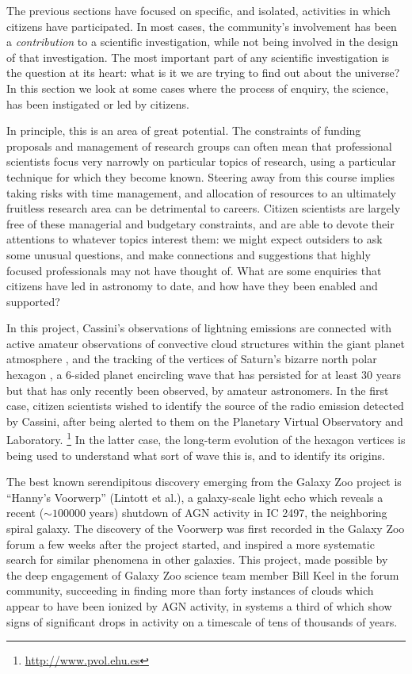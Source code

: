 \documentclass{ar2e}
\begin{document}
The previous sections have focused on specific, and isolated, activities in
which citizens have participated. In most cases, the community's involvement has
been a {\it contribution} to a scientific investigation, while not being
involved in the design of that investigation. The most important part of any
scientific investigation is the question at its heart: what is it we are trying
to find out about the universe? In this section we look at some cases where the
process of enquiry, the science, has been instigated or led by citizens.  

In principle, this is an area of great potential. The constraints of funding
proposals and management of research groups can often mean that professional
scientists focus very narrowly on particular topics of research, using a
particular technique for which they become known.  Steering away from this
course implies taking risks with time management, and allocation of resources to
an ultimately fruitless research area can be detrimental to careers.  Citizen
scientists are largely free of these managerial and budgetary constraints, and
are able to devote their attentions to whatever topics interest them: we might
expect outsiders to ask some unusual questions, and make connections and
suggestions that highly focused professionals may not have thought of. What are
some enquiries that citizens have led in astronomy to date, and how have they
been enabled and supported?


  In this project, Cassini's observations of
lightning emissions are connected with active amateur observations of
convective cloud structures within the giant planet atmosphere
\citep{Fischer++2011},  and the tracking of the vertices of Saturn's bizarre
north polar hexagon \citep{godfrey88}, a 6-sided planet encircling wave that
has persisted for at least 30 years but that has only recently been observed,
by amateur astronomers.  In the first case, citizen scientists wished to
identify the source of the radio emission detected by Cassini, after being
alerted to them on the Planetary Virtual  Observatory and Laboratory.
\footnote{\url{http://www.pvol.ehu.es}} In the latter case, the long-term evolution
of the hexagon vertices is being used to understand what sort of wave this is,
and to identify its origins.


 The best known serendipitous discovery
emerging from the Galaxy Zoo project is ``Hanny's Voorwerp'' (Lintott et al.), a
galaxy-scale light echo which reveals a recent ($\sim 100000$ years) shutdown of
AGN activity in IC 2497, the neighboring spiral galaxy. The discovery of the
Voorwerp was first recorded in the Galaxy Zoo forum a few weeks after the
project started, and inspired a more systematic search for similar phenomena in
other galaxies. This project, made possible by the deep engagement of Galaxy Zoo
science team member Bill Keel in the forum community, succeeding in finding more
than forty instances of clouds which appear to have been ionized by AGN
activity, in systems a third of which show signs of significant drops in
activity on a timescale of tens of thousands of years. 
\end{document}
